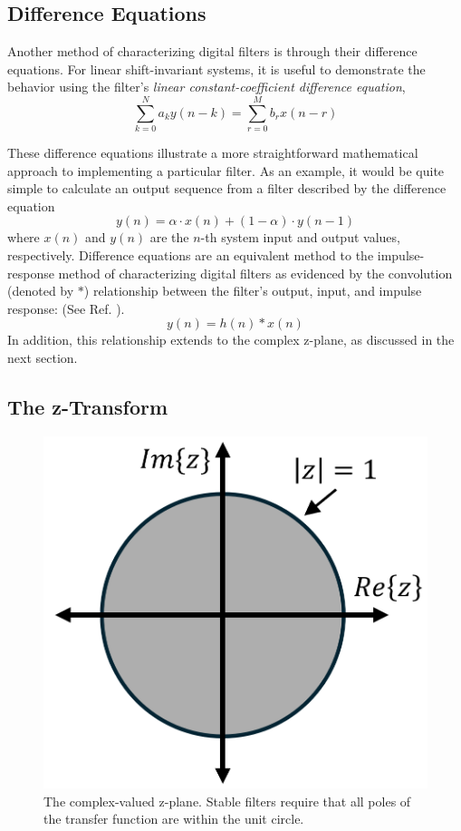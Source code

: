 \documentclass[reprint,amsmath,amssymb,aps,pra]{revtex4-2}
\begin{document}
\subsection{Difference Equations}

Another method of characterizing digital filters is through their difference equations. For linear shift-invariant systems, it is useful to demonstrate the behavior using the filter's \textit{linear constant-coefficient difference equation},
\begin{equation}
    \sum_{k=0}^Na_ky(n-k) = \sum_{r=0}^Mb_rx(n-r)
\end{equation}

These difference equations illustrate a more straightforward mathematical approach to implementing a particular filter. As an example, it would be quite simple to calculate an output sequence from a filter described by the difference equation
$$
y(n) = \alpha \cdot x(n) + (1-\alpha)\cdot y(n-1)
$$
where $x(n)$ and $y(n)$ are the $n$-th system input and output values, respectively. Difference equations are an equivalent method to the impulse-response method of characterizing digital filters as evidenced by the convolution (denoted by $*$) relationship between the filter's output, input, and impulse response: (See Ref. \cite{DSP}).
\begin{equation}
    y(n) = h(n) * x(n)
\end{equation}
In addition, this relationship extends to the complex z-plane, as discussed in the next section.

\subsection{The z-Transform}

\begin{figure}
    \centering
    \includegraphics[width=0.6\linewidth]{figs/zplane.png}
    \caption{The complex-valued z-plane. Stable filters require that all poles of the transfer function are within the unit circle.}
    \label{fig:unitcircle}
\end{figure}
\end{document}
